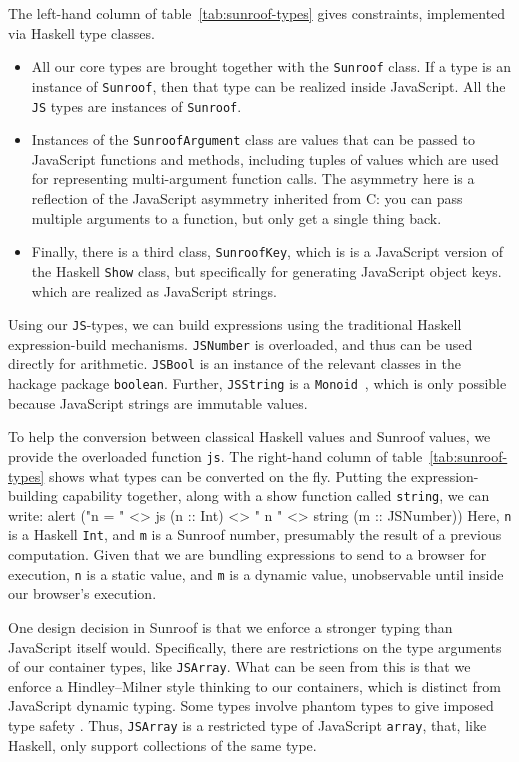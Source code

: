 \documentclass{llncs}
\newcommand{\Src}[1]{{\tt{#1}}}
\newenvironment{Code}{\verbatim}{\endverbatim}
\begin{document}
The left-hand column of table~\ref{tab:sunroof-types} gives constraints,
implemented via Haskell type classes.
\begin{itemize}
\item  All our core types are brought together with the \Src{Sunroof} class.
If a type is an instance of \Src{Sunroof}, then that type can be realized inside JavaScript.
All the \Src{JS} types are instances of \Src{Sunroof}.

\item Instances of the \Src{SunroofArgument} class
are values that can be passed to JavaScript functions and methods,
including tuples of values which are used for representing multi-argument 
function calls.
The asymmetry here is a reflection of the JavaScript
asymmetry inherited from C: you can pass multiple arguments
to a function, but only get a single thing back.

\item Finally, there is a third class, \Src{SunroofKey}, which is
is a JavaScript version of the Haskell \Src{Show} class,
but specifically for generating JavaScript object keys.
which are realized as JavaScript strings.
\end{itemize}

Using our \Src{JS}-types, we can build expressions using the traditional Haskell expression-build
mechanisms. \Src{JSNumber} is overloaded, and thus can be used directly for arithmetic.
\Src{JSBool} is an instance of the relevant classes in the hackage package \verb|boolean|.
Further, \Src{JSString} is a \Src{Monoid}~\cite{..}, which is only possible because JavaScript
strings are immutable values.

To help the conversion between classical Haskell values and Sunroof values,
we provide the overloaded function \Src{js}. The right-hand column of 
table~\ref{tab:sunroof-types} shows what types can be converted on the fly.
Putting the expression-building capability together, 
along with a show function called \Src{string}, we can write:
\begin{Code}
alert ("n =  " <> js (n :: Int) <> " n " <> string (m :: JSNumber))
\end{Code}
Here, \Src{n} is a Haskell \Src{Int}, and \Src{m} is a Sunroof number,
presumably the result of a previous computation. Given that we are 
bundling expressions to send to a browser for execution, \Src{n}
is a static value, and \Src{m} is a dynamic value, unobservable until inside our browser's execution.

One design decision in Sunroof is that we enforce a stronger typing than JavaScript itself would.
Specifically, there are restrictions on the type arguments of our container types,
like \Src{JSArray}. What can be seen from this is that we
enforce a Hindley–Milner style thinking to our containers,
which is distinct from JavaScript dynamic typing.
Some types involve
phantom types to give imposed type safety \cite{Cheney:03:FirstClassPhantomTypes}.
Thus, \Src{JSArray} is a restricted type of JavaScript \Src{array}, that, like Haskell,
only support collections of the same type.
\end{document}
